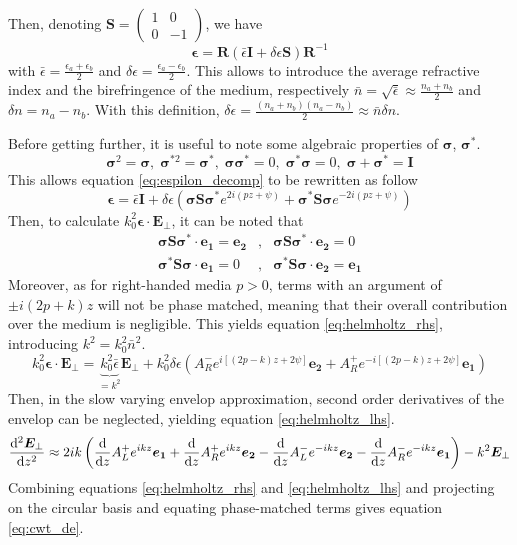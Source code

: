 Then, denoting $\mathbf{S}=\begin{pmatrix}1 & 0\\0&-1\end{pmatrix}$, we have 
\begin{equation}
	\bm{\epsilon} = \bm{R}\left(\bar{\epsilon}\mathbf{I} + \delta\epsilon \mathbf{S}\right)\bm{R}^{-1} \label{eq:espilon_decomp}
\end{equation}
with $\bar{\epsilon}=\frac{\epsilon_a+\epsilon_b}{2}$ and $\delta\epsilon=\frac{\epsilon_a-\epsilon_b}{2}$. This allows to introduce the average refractive index and the birefringence of the medium, respectively $\bar{n} = \sqrt{\bar{\epsilon}} \approx \frac{n_a+n_b}{2}$ and $\delta n = n_a - n_b$. With this definition, $\delta\epsilon = \frac{(n_a + n_b)(n_a - n_b)}{2} \approx \bar{n}\delta n$. 

Before getting further, it is useful to note some algebraic properties of $\bm{\sigma}$, $\bm{\sigma}^*$.
\begin{equation}
	\bm{\sigma}^2 = \bm{\sigma},\;\bm{\sigma}^{*2} = \bm{\sigma}^*,\;\bm{\sigma}\bm{\sigma}^* = 0,\;\bm{\sigma}^*\bm{\sigma} = 0,\;\bm{\sigma} + \bm{\sigma}^* = \bm{I}
\end{equation}
This allows equation \ref{eq:espilon_decomp} to be rewritten as follow
\begin{equation}
	\bm{\epsilon} = \bar{\epsilon}\bm{I} + \delta\epsilon\left(\bm{\sigma}\bm{S}\bm{\sigma}^*e^{2i(pz+\psi)} + \bm{\sigma}^*\bm{S}\bm{\sigma}e^{-2i(pz+\psi)}\right) \label{eq:epsilonsigma}
\end{equation}
Then, to calculate $k_0^2\bm{\epsilon}\cdot\bm{E}_\perp$, it can be noted that
\begin{eqnarray}
	\bm{\sigma}\bm{S}\bm{\sigma}^*\cdot\bm{e_1}=\bm{e_2} &,& \bm{\sigma}\bm{S}\bm{\sigma}^*\cdot\bm{e_2}=0 \\
	\bm{\sigma}^*\bm{S}\bm{\sigma}\cdot\bm{e_1}=0 &,& \bm{\sigma}^*\bm{S}\bm{\sigma}\cdot\bm{e_2}=\bm{e_1}
\end{eqnarray}
Moreover, as for right-handed media $p>0$, terms with an argument of $\pm i(2p+k)z$ will not be phase matched, meaning that their overall contribution over the medium is negligible. This yields equation \ref{eq:helmholtz_rhs}, introducing $k^2=k_0^2\bar{n}^2$.
\begin{equation}
	k_0^2\bm{\epsilon}\cdot\bm{E}_\perp = \underbrace{k_0^2\bar{\epsilon}}_{=k^2}\bm{E}_\perp + k_0^2\delta\epsilon\left(A_R^-e^{i[(2p-k)z+2\psi]}\bm{e_2} + A_R^+e^{-i[(2p-k)z+2\psi]}\bm{e_1}\right)\label{eq:helmholtz_rhs}
\end{equation}
Then, in the slow varying envelop approximation, second order derivatives of the envelop can be neglected, yielding equation \ref{eq:helmholtz_lhs}.
\begin{equation}
	\dv[2]{\bm{E}_\perp}{z} \approx 2ik \left( \dv{z}A_L^+e^{ikz}\bm{e_1} + \dv{z}A_R^+e^{ikz}\bm{e_2} - \dv{z}A_L^-e^{-ikz}\bm{e_2} - \dv{z}A_R^-e^{-ikz}\bm{e_1}\right) - k^2\bm{E}_\perp \label{eq:helmholtz_lhs}
\end{equation}
%
Combining equations \ref{eq:helmholtz_rhs} and \ref{eq:helmholtz_lhs} and projecting on the circular basis and equating phase-matched terms gives equation \ref{eq:cwt_de}.

